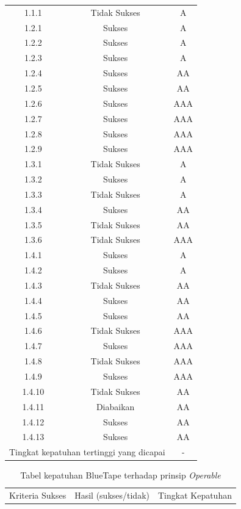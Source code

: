\documentclass[a4paper,twoside]{article}
\begin{document}
\begin{enumerate}
\begin{table}[H]
\begin{tabular}{|c|c|c|}
				\midrule
				1.1.1 & Tidak Sukses & A \\
				1.2.1 & Sukses & A \\
				1.2.2 & Sukses & A \\
				1.2.3 & Sukses & A \\
				1.2.4 & Sukses & AA \\
				1.2.5 & Sukses & AA \\
				1.2.6 & Sukses & AAA \\
				1.2.7 & Sukses & AAA \\
				1.2.8 & Sukses & AAA \\
				1.2.9 & Sukses & AAA \\
				1.3.1 & Tidak Sukses & A \\
				1.3.2 & Sukses & A \\
				1.3.3 & Tidak Sukses & A \\
				1.3.4 & Sukses & AA \\
				1.3.5 & Tidak Sukses & AA \\
				1.3.6 & Tidak Sukses & AAA \\
				1.4.1 & Sukses & A \\
				1.4.2 & Sukses & A \\
				1.4.3 & Tidak Sukses & AA \\
				1.4.4 & Sukses & AA \\
				1.4.5 & Sukses & AA \\
				1.4.6 & Tidak Sukses & AAA \\
				1.4.7 & Sukses & AAA \\
				1.4.8 & Tidak Sukses & AAA \\
				1.4.9 & Sukses & AAA \\
				1.4.10 & Tidak Sukses & AA \\
				1.4.11 & Diabaikan & AA \\
				1.4.12 & Sukses & AA \\
				1.4.13 & Sukses & AA \\
				
				\bottomrule
				\multicolumn{2}{|c|}{Tingkat kepatuhan tertinggi yang dicapai} & - \\
				\bottomrule

			\end{tabular}
		\end{table}
		\begin{table}[H]
			\centering 
			\caption{Tabel kepatuhan BlueTape terhadap prinsip \textit{Operable}}
			\label{tab:kepatuhan_bluetape_operable}
			\begin{tabular}{|c|c|c|}
				\toprule
				Kriteria Sukses & Hasil (sukses/tidak) & Tingkat Kepatuhan\\


\end{tabular}
\end{table}
\end{enumerate}
\end{document}
